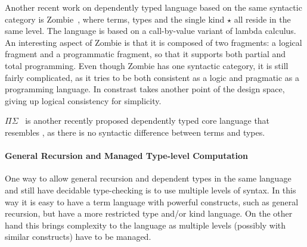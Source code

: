 Another recent work on dependently typed language based on the same
syntactic category is \textsf{Zombie}~\cite{zombie:popl14,
  zombie:thesis}, where terms, types and the single kind $\star$ all
reside in the same level. The language is based on a call-by-value
variant of lambda calculus. An interesting aspect of Zombie is that
it is composed of two fragments: a logical fragment and a programmatic
fragment, so that it supports both partial and total programming. Even
though Zombie has one syntactic category, it is still fairly
complicated, as it tries to be both consistent as a logic and
pragmatic as a programming language. In constrast \name takes 
another point of the design space, giving up logical consistency 
for simplicity.

$\Pi\Sigma$~\cite{dep:pisigma} is another recently proposed
dependently typed core language that resembles \name, as there is no
syntactic difference between terms and types.

\paragraph{General Recursion and Managed Type-level Computation}
One way to allow general recursion and dependent types in the same
language and still have decidable type-checking is to use multiple
levels of syntax. In this way it is easy to have a term language with 
powerful constructs, such as general recursion, but have a more
restricted type and/or kind language. On the other hand this brings 
complexity to the language as multiple levels (possibly with similar
constructs) have to be managed.


\begin{comment}
As discussed in \S\ref{sec:rec}, bringing general
recursion blindly into the dependently typed world causes more trouble
than convenience. There are many dependently typed languages that
allow general recursion. Zombie approaches general recursion by
separating a consistent sub-language, in which all expressions are
known to terminate, from a programmatic language that supports general
recursion. What is interesting about Zombie is that those two
seemingly conflicting worlds can interact with each other nicely,
without compromising the consistency property. The key idea of this is
to distinguish between these two fragments by using a
\emph{consistency classifier $\theta$}. When $\theta$ is \textsf{L},
it means the logical part, and \textsf{P} the program part. Like
\name, Zombie uses \textsf{roll} and \textsf{unroll} for iso-recursive
types. To ensure normalization (in order for decidable type checking),
it forbids the use of \textsf{unroll} in \textsf{P}, where the
potential non-termination could arise.\bruno{Zombie is being discussed
in two different places.}
\end{comment}

